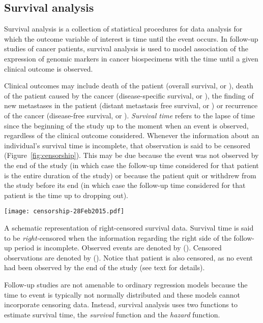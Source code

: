 \subsection{Survival analysis}
\label{sec:methods-survival-analysis}

Survival analysis is a collection of statistical procedures for data analysis
for which the outcome variable of interest is time until the event
occurs.\cite{kleinbaum_survival_1996} In follow-up studies of cancer patients,
survival analysis is used to model association of the expression of genomic
markers in cancer biospecimens with the time until a given clinical outcome is
observed.

Clinical outcomes may include death of the patient (overall survival, or
), death of the patient caused by the cancer (disease-specific
survival, or ), the finding of new metastases in the patient
(distant metastasis free survival, or ) or recurrence of the
cancer (disease-free survival, or ).  \emph{Survival time} refers
to the lapse of time since the beginning of the study up to the moment when an
event is observed, regardless of the clinical outcome considered.  Whenever the
information about an individual's survival time is incomplete, that observation
is said to be censored (Figure~\ref{fig:censorship}).  This may be due because
the event was not observed by the end of the study (in which case the follow-up
time considered for that patient is the entire duration of the study) or because
the patient quit or withdrew from the study before its end (in which case the
follow-up time considered for that patient is the time up to dropping out).

\begin{marginfigure}%
  \texttt{[image: censorship-28Feb2015.pdf]}
  \caption[Right-censored survival data]{A schematic representation of
    right-censored survival data.  Survival time is said to be
    \emph{right-}censored when the information regarding the right side of the
    follow-up period is incomplete.  Observed events are denoted by (\CIRCLE).
    Censored observations are denoted by (\Circle).  Notice that patient
     is also censored, as no event had been observed by the end
    of the study (see text for details).}\label{fig:censorship}%
\end{marginfigure}

Follow-up studies are not amenable to ordinary regression models because the
time to event is typically not normally distributed and these models cannot
incorporate censoring data.  Instead, survival analysis uses two functions to
estimate survival time, the \emph{survival} function and the \emph{hazard}
function.

